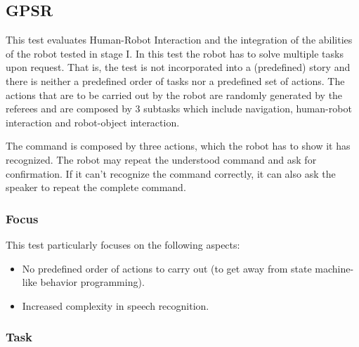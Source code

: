 \subsection{GPSR}

This test evaluates Human-Robot Interaction and the integration of the abilities of the robot tested in stage I. In this test the robot has to solve multiple tasks upon request. That is, the test is not incorporated into a (predefined) story and there is neither a predefined order of tasks nor a predefined set of actions. The actions that are to be carried out by the robot are randomly generated by the referees and are composed by 3 subtasks which include navigation, human-robot interaction and robot-object interaction.

The command is composed by three actions, which the robot has to
show it has recognized. The robot may repeat the understood command and ask for confirmation. If it can't recognize the command correctly, it can also ask the speaker to repeat the complete command.

\subsubsection{Focus}
This test particularly focuses on the following aspects:
\begin{itemize}
\item No predefined order of actions to carry out (to get away from state machine-like behavior programming).
\item Increased complexity in speech recognition.
\end{itemize}

\subsubsection{Task}


